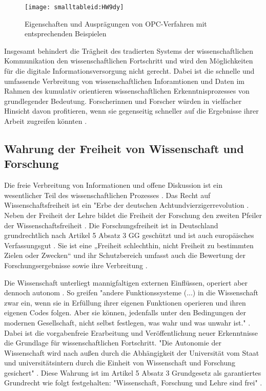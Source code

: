 \begin{figure}[h!]
\texttt{[image: smalltableid:HW9dy]}
\caption{Eigenschaften und Ausprägungen von OPC-Verfahren mit entsprechenden Beispielen}
\end{figure}

Insgesamt behindert die Trägheit des tradierten Systems der wissenschaftlichen Kommunikation den wissenschaftlichen Fortschritt und wird den Möglichkeiten für die digitale Informationsversorgung nicht gerecht. Dabei ist die schnelle und umfassende Verbreitung von wissenschaftlichen Inforamtionen und Daten im Rahmen des kumulativ orientieren wissenschaftlichen Erkenntnisprozesses von grundlegender Bedeutung. Forscherinnen und Forscher würden in vielfacher Hinsicht davon profitieren, wenn sie gegenseitig schneller auf die Ergebnisse ihrer Arbeit zugreifen könnten \cite{nosek_2012_scientific} \cite{winkler_2011_anforderungen}.

\subsection{Wahrung der Freiheit von Wissenschaft und Forschung}

Die freie Verbreitung von Informationen und offene Diskussion ist ein wesentlicher Teil des wissenschaftlichen Prozesses \cite{edsall_1976_scientific}. Das Recht auf Wissenschaftsfreiheit ist ein "Erbe der deutschen Achtundvierzigerrevolution \cite{kempny_2013_wissfreiheit}. Neben der Freiheit der Lehre bildet die Freiheit der Forschung den zweiten Pfeiler der Wissenschaftsfreiheit \cite{thurnherr_2014_pubfreiheit}. Die Forschungsfreiheit ist in Deutschland grundrechtlich nach Artikel 5 Absatz 3 GG  geschützt und ist auch europäisches Verfassungsgut \cite{kempny_2013_wissfreiheit}. Sie ist eine „Freiheit schlechthin, nicht Freiheit zu bestimmten Zielen oder Zwecken“ \cite{Boeckenfoerde_1974} und ihr Schutzbereich umfasst auch die Bewertung der Forschungsergebnisse sowie ihre Verbreitung \cite{Pfeiffer_2013_forschungsfreiheit}.

Die Wissenschaft unterliegt mannigfaltigen externen Einflüssen, operiert aber dennoch autonom \cite{Luhmann1998}. So greifen "andere Funktionssysteme (...) in die Wissenschaft zwar ein, wenn sie in Erfüllung ihrer eigenen Funktionen operieren und ihren eigenen Codes folgen. Aber sie können, jedenfalls unter den Bedingungen der modernen Gesellschaft, nicht selbst festlegen, was wahr und was unwahr ist."  \cite{Luhmann1998}. Dabei ist die vorgabenfreie Erarbeitung und Veröffentlichung neuer Erkenntnisse die Grundlage für wissenschaftlichen Fortschritt. "Die Autonomie der Wissenschaft wird nach außen durch die Abhängigkeit der Universität vom Staat und universitätsintern durch die Einheit von Wissenschaft und Forschung gesichert" \cite{Huber_2005}. Diese Wahrung ist im Artikel 5 Absatz 3 Grundgesetz als garantiertes Grundrecht wie folgt festgehalten: "Wissenschaft, Forschung und Lehre sind frei" \cite{suchen_GG}.

